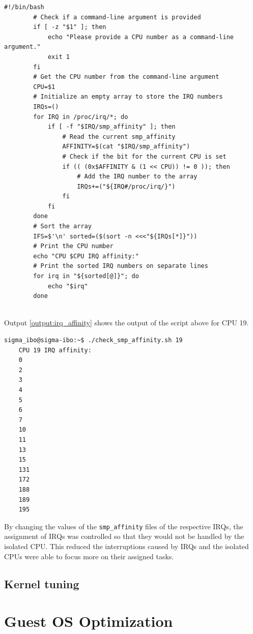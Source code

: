 \documentclass[MMR,Master,english]{twbook}
\begin{document}
\vspace{1em}
\begin{minipage}{0.95\columnwidth}
	\begin{lstlisting}[name={Check distribution of Interrupt Requests across each CPU},label={script:smp_affinity}]
		#!/bin/bash
		# Check if a command-line argument is provided
		if [ -z "$1" ]; then
			echo "Please provide a CPU number as a command-line argument."
			exit 1
		fi
		# Get the CPU number from the command-line argument
		CPU=$1
		# Initialize an empty array to store the IRQ numbers
		IRQs=()
		for IRQ in /proc/irq/*; do
			if [ -f "$IRQ/smp_affinity" ]; then
				# Read the current smp_affinity
				AFFINITY=$(cat "$IRQ/smp_affinity")
				# Check if the bit for the current CPU is set
				if (( (0x$AFFINITY & (1 << CPU)) != 0 )); then
					# Add the IRQ number to the array
					IRQs+=("${IRQ#/proc/irq/}")
				fi
			fi
		done
		# Sort the array
		IFS=$'\n' sorted=($(sort -n <<<"${IRQs[*]}"))
		# Print the CPU number
		echo "CPU $CPU IRQ affinity:"
		# Print the sorted IRQ numbers on separate lines
		for irq in "${sorted[@]}"; do
			echo "$irq"
		done
		
\end{lstlisting}
\end{minipage}

Output \ref{output:irq_affinity} shows the output of the script above for CPU 19.

\vspace{1em}
\begin{minipage}{0.95\columnwidth}
\begin{lstlisting}[name={Output of smp_affinity for CPU 19},label={output:irq_affinity}, breaklines=true]
	sigma_ibo@sigma-ibo:~$ ./check_smp_affinity.sh 19
	CPU 19 IRQ affinity:
	0
	2
	3
	4
	5
	6
	7
	10
	11
	13
	15
	131
	172
	188
	189
	195
\end{lstlisting}
\end{minipage}


\noindent By changing the values of the \texttt{smp\_affinity} files of the respective IRQs, the assignment of IRQs was controlled so that they would not be handled by the isolated CPU. This reduced the interruptions caused by IRQs and the isolated CPUs were able to focus more on their assigned tasks.

\subsection{Kernel tuning}

\section{Guest OS Optimization}
\end{document}
